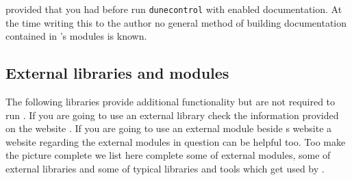 provided that you had before run \texttt{dunecontrol} with enabled documentation.
At the time writing this to the author no general method of building documentation contained in \Dune's modules is known.


\subsection{External libraries and modules} \label{sec:external-modules-libraries}

The following libraries provide additional functionality but are not required to run \Dumux. 
If you are going to use an external library check the information provided on the \Dune website \cite{DUNE-EXT-LIB}. If you are going to use an external \Dune module beside {\Dune}s website a website \cite{DUNE-EXT-MOD} regarding the external modules in question can be helpful too.
Too make the picture complete we list here complete some of external modules, some of external libraries and some of typical libraries and tools which get used by \Dune.


